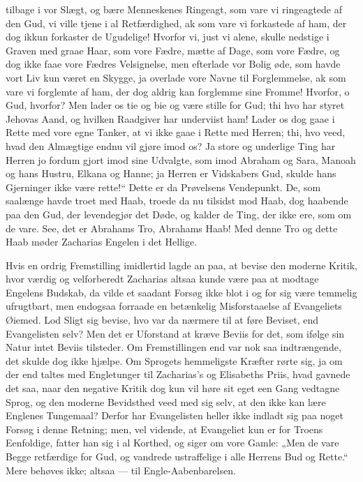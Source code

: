 \documentclass[12pt,a4paper]{book}
\begin{document}
tilbage i vor Slægt, og bære Menneskenes Ringeagt, som vare vi
ringeagtede af den Gud, vi ville tjene i al Retfærdighed, ak som
vare vi forkastede af ham, der dog ikkun forkaster de Ugudelige!
Hvorfor vi, just vi alene, skulle nedstige i Graven med graae
Haar, som vore Fædre, mætte af Dage, som vore Fædre, og dog ikke
faae vore Fædres Velsignelse, men efterlade vor Bolig øde, som
havde vort Liv kun været en Skygge, ja overlade vore Navne til
Forglemmelse, ak som vare vi forglemte af ham, der dog aldrig kan
forglemme sine Fromme! Hvorfor, o Gud, hvorfor? Men lader os tie
og bie og være stille for Gud; thi hvo har styret Jehovas Aand, og
hvilken Raadgiver har underviist ham! Lader os dog gaae i Rette
med vore egne Tanker, at vi ikke gaae i Rette med Herren; thi, hvo
veed, hvad den Almægtige endnu vil gjøre imod os? Ja store og
underlige Ting har Herren jo fordum gjort imod sine Udvalgte, som
imod Abraham og Sara, Manoah og hans Hustru, Elkana og Hanne;
ja Herren er Vidskabers Gud, skulde hans Gjerninger ikke være
rette!“ Dette er da Prøvelsens Vendepunkt. De, som saalænge
havde troet med Haab, troede da nu tilsidst mod Haab, dog haabende
paa den Gud, der levendegjør det Døde, og kalder de Ting, der ikke
ere, som om de vare. See, det er Abrahams Tro, Abrahams Haab!
Med denne Tro og dette Haab møder Zacharias Engelen i det Hellige.

Hvis en ordrig Fremstilling imidlertid lagde an paa, at bevise den
moderne Kritik, hvor værdig og velforberedt Zacharias altsaa kunde
være paa at modtage Engelens Budskab, da vilde et saadant Forsøg
ikke blot i og for sig være temmelig ufrugtbart, men endogsaa
forraade en betænkelig Misforstaaelse af Evangeliets Øiemed. Lod
Sligt sig bevise, hvo var da nærmere til at føre Beviset, end
Evangelisten selv? Men det er Uforstand at kræve Beviis for det,
som ifølge sin Natur intet Beviis tilsteder. Om Fremstillingen
end var nok saa indtrængende, det skulde dog ikke hjælpe. Om
Sprogets hemmeligste Kræfter rørte sig, ja om der end taltes med
Engletunger til Zacharias's og Elisabeths Priis, hvad gavnede det
saa, naar den negative Kritik dog kun vil høre sit eget een Gang
vedtagne Sprog, og den moderne Bevidsthed veed med sig selv, at
den ikke kan lære Englenes Tungemaal? Derfor har Evangelisten
heller ikke indladt sig paa noget Forsøg i denne Retning; men, vel
vidende, at Evangeliet kun er for Troens Eenfoldige, fatter han
sig i al Korthed, og siger om vore Gamle: „Men de vare Begge
retfærdige for Gud, og vandrede ustraffelige i alle Herrens Bud og
Rette.“ Mere behøves ikke; altsaa --- til Engle-Aabenbarelsen.
\end{document}
